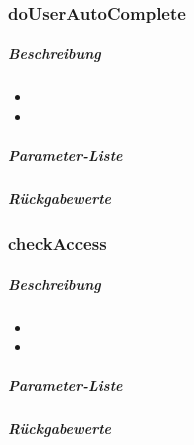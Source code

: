 \subsubsection*{doUserAutoComplete}\label{doUserAutoCompleteGDGUI}
\subparagraph{Beschreibung}
\begin{itemize}
	\item[] \noindent{}
	\item[] 
\end{itemize}
\subparagraph{Parameter-Liste}
\subparagraph{Rückgabewerte}

\subsubsection*{checkAccess}\label{checkAccessGDGUI}
\subparagraph{Beschreibung}
\begin{itemize}
	\item[] \noindent{}
	\item[] 
\end{itemize}
\subparagraph{Parameter-Liste}
\subparagraph{Rückgabewerte}